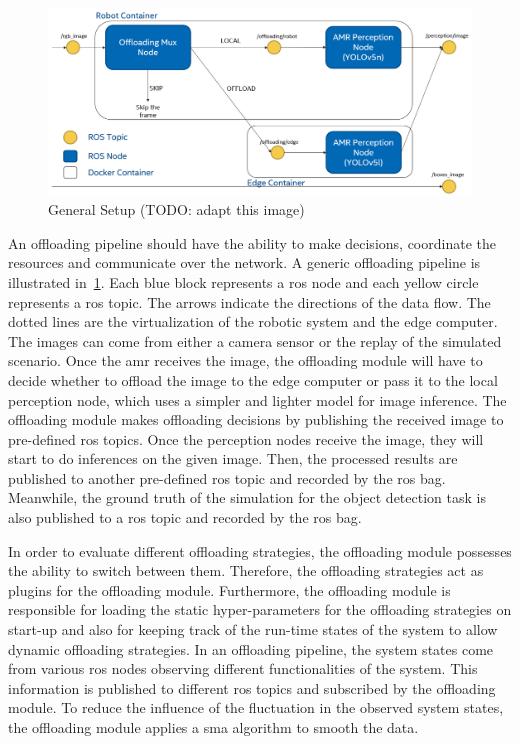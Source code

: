 \begin{figure}[htp]
    \centering
    \includegraphics[width=0.8\linewidth]{figures/setup/general_setup.png}
    \caption{General Setup (TODO: adapt this image)}
    \label{fig:general_setup}
\end{figure}

An offloading pipeline should have the ability to make decisions, coordinate the resources and communicate over the network. A generic offloading pipeline is illustrated in~\cref{fig:general_setup}. Each blue block represents a \gls{ros} node and each yellow circle represents a \gls{ros} topic. The arrows indicate the directions of the data flow. The dotted lines are the virtualization of the robotic system and the edge computer. The images can come from either a camera sensor or the replay of the simulated scenario. Once the \gls{amr} receives the image, the offloading module will have to decide whether to offload the image to the edge computer or pass it to the local perception node, which uses a simpler and lighter model for image inference. The offloading module makes offloading decisions by publishing the received image to pre-defined \gls{ros} topics. Once the perception nodes receive the image, they will start to do inferences on the given image. Then, the processed results are published to another pre-defined \gls{ros} topic and recorded by the \gls{ros} bag. Meanwhile, the ground truth of the simulation for the object detection task is also published to a \gls{ros} topic and recorded by the \gls{ros} bag. 

In order to evaluate different offloading strategies, the offloading module possesses the ability to switch between them. Therefore, the offloading strategies act as plugins for the offloading module. Furthermore, the offloading module is responsible for loading the static hyper-parameters for the offloading strategies on start-up and also for keeping track of the run-time states of the system to allow dynamic offloading strategies. In an offloading pipeline, the system states come from various \gls{ros} nodes observing different functionalities of the system. This information is published to different \gls{ros} topics and subscribed by the offloading module. To reduce the influence of the fluctuation in the observed system states, the offloading module applies a \gls{sma} algorithm to smooth the data. 

